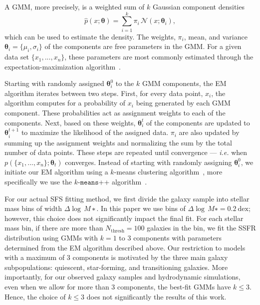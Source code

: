 \documentclass[preprint2,tighten]{aastex62}
\begin{document}
A GMM, more precisely, is a weighted sum of $k$ Gaussian component densities 
\begin{equation} \label{eq:gmm}
\hat{p}(x;\bm{\theta}) = \sum\limits_{i=1}^{k} \pi_i \, \mathcal{N}(x; \bm{\theta}_i),
\end{equation}
which can be used to estimate the density. The weights, $\pi_i$, mean, and 
variance $\bm{\theta}_i=\{\mu_i, \sigma_i\}$ of the components are free 
parameters in the GMM. For a given data set $\{x_1, ..., x_n\}$, these 
parameters are most commonly estimated through the expectation-maximization 
algorithm~\citep[EM;]{dempster1977,neal1998}. 

Starting with randomly assigned $\bm{\theta}_{i}^0$ to the $k$ GMM components, 
the EM algorithm iterates between two steps. First, for every data point, 
$x_i$, the algorithm computes for a probability of $x_i$ being generated by 
each GMM component. These probabilities act as assignment weights to each of
the components. Next, based on these weights, $\bm{\theta}_i^t$ of the components 
are updated to $\bm{\theta}_i^{t+1}$ to maximize the likelihood of the assigned 
data. $\pi_i$ are also updated by summing up the assignment weights and 
normalizing the sum by the total number of data points. These steps are 
repeated until convergence --- \emph{i.e.} when $p(\{x_1, ..., x_n\} ; \bm{\theta}_t)$ 
converges. Instead of starting with randomly assigning $\bm{\theta}_{i}^0$, 
we initiate our EM algorithm using a $k$-means clustering algorithm~\citep{lloyd1982},
more specifically we use the $k$-$\mathtt{means}$++ algorithm~\citep{arthur2007}. 

For our actual SFS fitting method, we first divide the galaxy 
sample into stellar mass bins of width $\Delta \log\,M∗$. In this paper 
we use bins of $\Delta \log\,M∗ = 0.2\ \mathrm{dex}$; however, this 
choice does not significantly impact the final fit. For each stellar 
mass bin, if there are more than $N_\mathrm{thresh}{=}100$ galaxies in the bin, 
we fit the SSFR distribution using GMMs with $k{=}1$ to 3 components with 
parameters determined from the EM algorithm described above. 
Our restriction to models with a maximum of 3 components is 
motivated by the three main galaxy subpopulations: quiescent, star-forming, 
and transitioning galaxies. More importantly, for our observed galaxy samples
and hydrodynamic simulations, even when we allow for more than 3 components,
the best-fit GMMs have $k\leq3$. Hence, the choice of $k\leq3$ does not 
significantly the results of this work.
\end{document}
